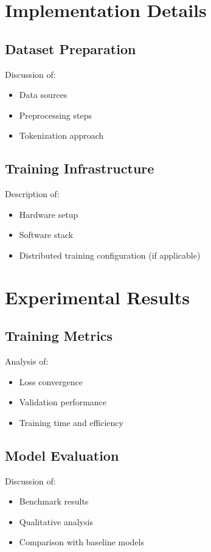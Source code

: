 \documentclass[12pt,a4paper]{article}
\begin{document}
\section{Implementation Details}
\subsection{Dataset Preparation}
Discussion of:
\begin{itemize}
    \item Data sources
    \item Preprocessing steps
    \item Tokenization approach
\end{itemize}

\subsection{Training Infrastructure}
Description of:
\begin{itemize}
    \item Hardware setup
    \item Software stack
    \item Distributed training configuration (if applicable)
\end{itemize}

\section{Experimental Results}
\subsection{Training Metrics}
Analysis of:
\begin{itemize}
    \item Loss convergence
    \item Validation performance
    \item Training time and efficiency
\end{itemize}

\subsection{Model Evaluation}
Discussion of:
\begin{itemize}
    \item Benchmark results
    \item Qualitative analysis
    \item Comparison with baseline models
\end{itemize}
\end{document}
